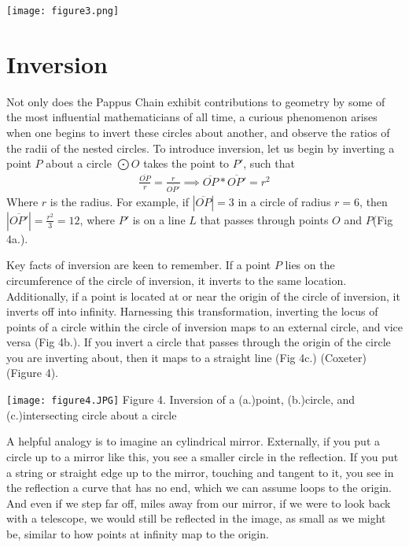 \documentclass[12pt]{article}
\begin{document}
\begin{center}
    \texttt{[image: figure3.png]}
\end{center}

\section{Inversion}
\hspace{\parindent}Not only does the Pappus Chain exhibit contributions to geometry by some of the most influential mathematicians of all time, a curious phenomenon arises when one begins to invert these circles about another, and observe the ratios of the radii of the nested circles. To introduce inversion, let us begin by inverting a point $P$ about a circle $\bigodot O$ takes the point to $P'$, such that 
\begin{align*}
    \frac{\overline{OP}}{r}=\frac{r}{\overline{OP'}} \implies \overline{OP}*\overline{OP'}= r^2
\end{align*}
Where $r$ is the radius. For example, if $|\overline{OP}|= 3$ in a circle of radius $r=6$, then $|\overline{OP'}|= \frac{r^2}{3} = 12$, where $P'$ is on a line $L$ that passes through points $O$ and $P$(Fig 4a.). 

Key facts of inversion are keen to remember. If a point $P$ lies on the circumference of the circle of inversion, it inverts to the same location. Additionally, if a point is located at or near the origin of the circle of inversion, it inverts off into infinity. Harnessing this transformation, inverting the locus of points of a circle within the circle of inversion maps to an external circle, and vice versa (Fig 4b.). If you invert a circle that passes through the origin of the circle you are inverting about, then it maps to a straight line (Fig 4c.) (Coxeter) (Figure 4).
\begin{center}
\texttt{[image: figure4.JPG]}
Figure 4. Inversion of a (a.)point, (b.)circle, and (c.)intersecting circle about a circle
\end{center}

A helpful analogy is to imagine an cylindrical mirror. Externally, if you put a circle up to a mirror like this, you see a smaller circle in the reflection. If you put a string or straight edge up to the mirror, touching and tangent to it, you see in the reflection a curve that has no end, which we can assume loops to the origin. And even if we step far off, miles away from our mirror, if we were to look back with a telescope, we would still be reflected in the image, as small as we might be, similar to how points at infinity map to the origin. 
\end{document}
